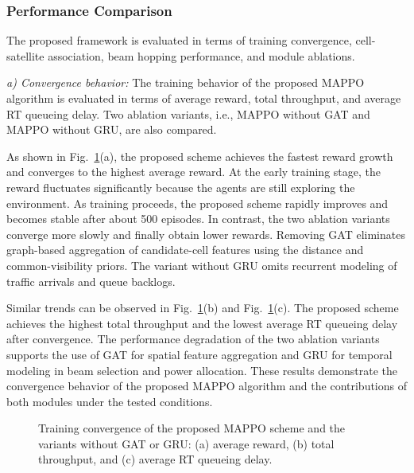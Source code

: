 \documentclass[journal]{IEEEtran}
\newcommand{\revbegin}[1]{\color{revisionblue}\ignorespaces}
\newcommand{\revend}[1]{\color{black}\ignorespaces}
\begin{document}
\revbegin{}\subsubsection{Performance Comparison}\revend{}
\revbegin{}The proposed framework is evaluated in terms of training convergence, cell-satellite association, beam hopping performance, and module ablations.\revend{}

\revbegin{}\textit{a) Convergence behavior:}
The training behavior of the proposed MAPPO algorithm is evaluated in terms of average reward, total throughput, and average RT queueing delay. Two ablation variants, i.e., MAPPO without GAT and MAPPO without GRU, are also compared.\revend{}

\revbegin{}As shown in Fig.~\ref{fig:training-metrics}(a), the proposed scheme achieves the fastest reward growth and converges to the highest average reward. At the early training stage, the reward fluctuates significantly because the agents are still exploring the environment. As training proceeds, the proposed scheme rapidly improves and becomes stable after about 500 episodes. In contrast, the two ablation variants converge more slowly and finally obtain lower rewards. Removing GAT eliminates graph-based aggregation of candidate-cell features using the distance and common-visibility priors. The variant without GRU omits recurrent modeling of traffic arrivals and queue backlogs.\revend{}

\revbegin{}Similar trends can be observed in Fig.~\ref{fig:training-metrics}(b) and Fig.~\ref{fig:training-metrics}(c). The proposed scheme achieves the highest total throughput and the lowest average RT queueing delay after convergence. The performance degradation of the two ablation variants supports the use of GAT for spatial feature aggregation and GRU for temporal modeling in beam selection and power allocation. These results demonstrate the convergence behavior of the proposed MAPPO algorithm and the contributions of both modules under the tested conditions.\revend{}

\begin{figure}[!t]
\centering

\revbegin{}\caption{Training convergence of the proposed MAPPO scheme and the variants without GAT or GRU: (a) average reward, (b) total throughput, and (c) average RT queueing delay.}\revend{}
\label{fig:training-metrics}
\end{figure}
\end{document}
